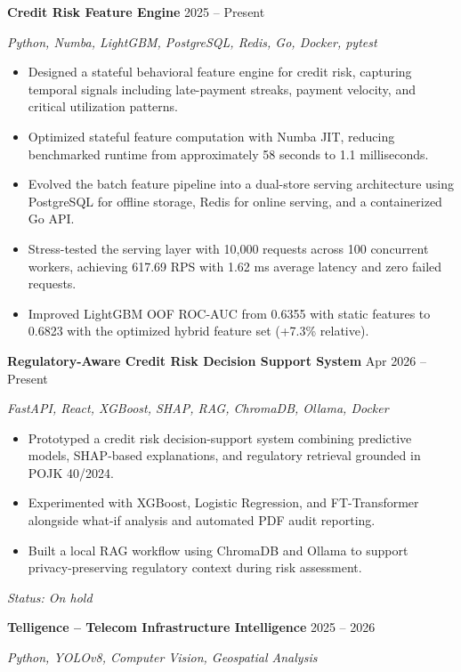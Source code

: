 \textbf{Credit Risk Feature Engine}
\hfill 2025 -- Present

\textit{Python, Numba, LightGBM, PostgreSQL, Redis, Go, Docker, pytest}

\begin{itemize}
    \item Designed a stateful behavioral feature engine for credit risk,
    capturing temporal signals including late-payment streaks,
    payment velocity, and critical utilization patterns.
    \item Optimized stateful feature computation with Numba JIT,
    reducing benchmarked runtime from approximately 58 seconds to
    1.1 milliseconds.
    \item Evolved the batch feature pipeline into a dual-store serving
    architecture using PostgreSQL for offline storage, Redis for online
    serving, and a containerized Go API.
    \item Stress-tested the serving layer with 10,000 requests across
    100 concurrent workers, achieving 617.69 RPS with 1.62 ms average
    latency and zero failed requests.
    \item Improved LightGBM OOF ROC-AUC from 0.6355 with static features
    to 0.6823 with the optimized hybrid feature set (+7.3\% relative).
\end{itemize}

\textbf{Regulatory-Aware Credit Risk Decision Support System}
\hfill Apr 2026 -- Present

\textit{FastAPI, React, XGBoost, SHAP, RAG, ChromaDB, Ollama, Docker}

\begin{itemize}
    \item Prototyped a credit risk decision-support system combining
    predictive models, SHAP-based explanations, and regulatory retrieval
    grounded in POJK 40/2024.
    \item Experimented with XGBoost, Logistic Regression, and
    FT-Transformer alongside what-if analysis and automated PDF audit
    reporting.
    \item Built a local RAG workflow using ChromaDB and Ollama to support
    privacy-preserving regulatory context during risk assessment.
\end{itemize}

\textit{Status: On hold}

\textbf{Telligence -- Telecom Infrastructure Intelligence}
\hfill 2025 -- 2026

\textit{Python, YOLOv8, Computer Vision, Geospatial Analysis}

